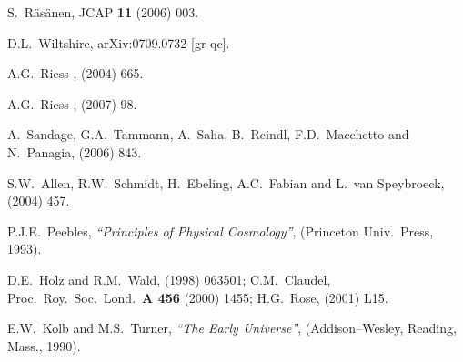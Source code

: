\documentclass[12pt]{iopart}
\begin{document}
\begin{thebibliography}{66}
S.~R\"as\"anen,
JCAP {\bf11} (2006) 003. %

D.L.~Wiltshire,
arXiv:0709.0732 [gr-qc].

A.G.~Riess \etal, %
 (2004) 665. %

A.G.~Riess \etal, %
 (2007) 98. %

A.~Sandage, G.A.~Tammann, A.~Saha, B.~Reindl, F.D.~Macchetto and N.~Panagia,
 (2006) 843. %

S.W.~Allen, R.W.~Schmidt, H.~Ebeling, A.C.~Fabian and L.~van Speybroeck,
 (2004) 457. %

P.J.E.~Peebles,
{\em``Principles of Physical Cosmology''}, (Princeton Univ.\ Press, 1993).

D.E.~Holz and R.M.~Wald,
 (1998) 063501; %
C.M.~Claudel,
Proc.\ Roy.\ Soc.\ Lond.\ {\bf A 456} (2000) 1455; %
H.G.~Rose,
 (2001) L15. %

E.W.~Kolb and M.S.~Turner,
{\em``The Early Universe''}, (Addison--Wesley, Reading, Mass., 1990).


\end{thebibliography}
\end{document}
